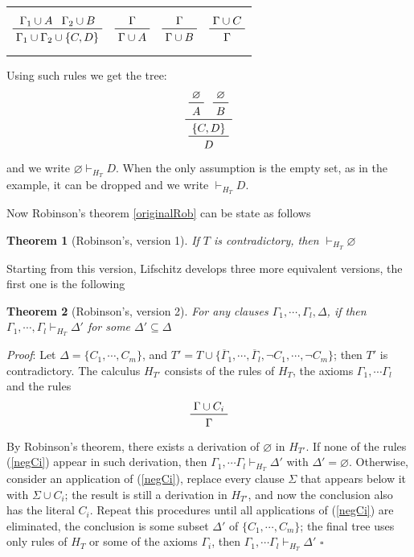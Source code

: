 \documentclass[a4paper,12pt,oneside]{book}
\newtheorem{theorem}{Theorem}[chapter]
\newcommand*{\QED}{\hfill\ensuremath{\square}}
\let\emptyset\varnothing
\begin{document}
\begin{center}
\begin{tabular}{cccc}
$$\prftree{\Gamma_1 \cup A } {\Gamma_2\cup B} {\Gamma_1\cup\Gamma_2\cup \{C,D\}} 
$$
& \hspace{5mm}
$$\prftree{\Gamma }  {\Gamma\cup A} 
$$
& \hspace{5mm}
$$\prftree{\Gamma }  {\Gamma\cup B} 
$$
& \hspace{5mm}
$$\prftree{\Gamma \cup C }  {\Gamma }
$$
\end{tabular}
\end{center}
Using such rules we get the tree:
$$
\prftree{\prftree{\emptyset}{A}}{\prftree{\emptyset}{B}}
{\prftree{\{C , D\}}{D}}
$$
and we write $\emptyset \vdash_{H_T} D$.  When the only assumption is the empty set, as in the example, it can be dropped and we write $\vdash_{H_T} D$.

Now Robinson's theorem \ref{originalRob} can be state as follows
\begin{theorem}[Robinson's, version 1]
If $T$ is contradictory, then $\vdash_{H_T} \emptyset$
\end{theorem}
\noindent Starting from this version, Lifschitz develops three more equivalent versions, the first one is the following
\begin{theorem}[Robinson's, version 2]\label{robinson2}
For any clauses $\Gamma_1,\cdots,\Gamma_l,\Delta$, 
if  then $\Gamma_1,\cdots ,\Gamma_l\vdash_{H_T} \Delta'$ for some $\Delta'\subseteq\Delta$
\end{theorem}

\textit{Proof}: Let $\Delta=\{C_1,\cdots,C_m\}$, and $T'= T\cup\{ \overline{\Gamma}_1, \cdots ,\overline{\Gamma}_l, \neg C_1,\cdots ,\neg C_m\}  $; then $T'$ is contradictory.
The calculus $H_{T'}$ consists of the rules of $H_T$, the axioms $\Gamma_1,\cdots\Gamma_l$ and the rules
\begin{equation}\label{negCi}
\prftree{\Gamma\cup C_i }{\Gamma }
\end{equation}
By Robinson's theorem, there exists a derivation of $\emptyset$ in $H_{T'}$. If none of the rules (\ref{negCi}) appear in such derivation, then $\Gamma_1,\cdots\Gamma_l\vdash_{H_T} \Delta'$ with $\Delta'=\emptyset$. Otherwise, consider an application of (\ref{negCi}), replace every clause $\Sigma$ that appears below it with $\Sigma\cup C_i$; the result is still a derivation in $H_{T'}$, and now the conclusion also has the literal $C_i$. Repeat this procedures until all applications of (\ref{negCi}) are eliminated, the conclusion is some subset $\Delta'$ of 	$\{C_1,\cdots,C_m\}$; the final tree uses only rules of $H_T$ or some of the axioms $\Gamma_i$, then 
$\Gamma_1,\cdots\Gamma_l\vdash_{H_T} \Delta'$
\QED
\end{document}
